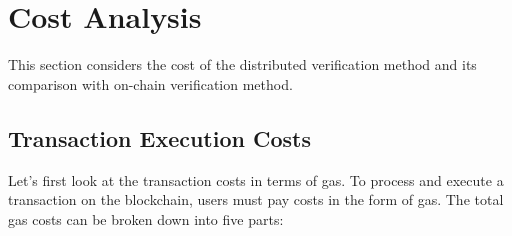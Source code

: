 \documentclass[runningheads]{llncs}
\begin{document}








 
\section{Cost Analysis}
This section considers the cost of the distributed verification method and its comparison with on-chain verification method.

\subsection{Transaction Execution Costs}
Let's first look at the transaction costs in terms of gas. To process and execute a transaction on the blockchain, users must pay costs in the form of gas. The total gas costs can be broken down into five parts:
\end{document}
